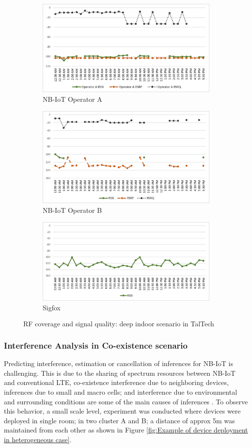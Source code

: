 \documentclass[12pt]{article}
\begin{document}
 \begin{figure}[H]
\begin{subfigure}[t]{\linewidth}
  \centering
  \includegraphics[width=.5\linewidth]{Images/tallinn/ATallinnDeepIndoor.pdf}  
  \caption{NB-IoT Operator A}
\end{subfigure}
\begin{subfigure}[t]{\linewidth}
  \centering
  \includegraphics[width=.5\linewidth]{Images/tallinn/BTallinnDeepIndoor.pdf}  
  \caption{NB-IoT Operator B}
  
\end{subfigure}
\begin{subfigure}[t]{\linewidth}
  \centering
  \includegraphics[width=.5\linewidth]{Images/tallinn/STallinnDeepIndoor.pdf}  
\caption{Sigfox}
 \end{subfigure}
\caption{RF coverage and signal quality: deep indoor scenario in TalTech}
 \label{RFDeepIndoorTallinn}
\end{figure}


\newpage \subsubsection{Interference Analysis in Co-existence scenario} \label{interferenceExp}
Predicting interference, estimation or cancellation of inferences for NB-IoT is challenging. This is due to the sharing of spectrum resources between NB-IoT and conventional LTE, co-existence interference due to neighboring devices, inferences due to small and macro cells; and interference due to environmental and surrounding conditions are some of the main causes of inferences \cite{mwakwata2019narrowband}. To observe this behavior, a small scale level, experiment was conducted where devices were deployed in single room; in two cluster A and B; a distance of approx 5m was maintained from each other as shown in Figure \ref{fig:Example of device deployment in heterogeneous case}.
\end{document}
